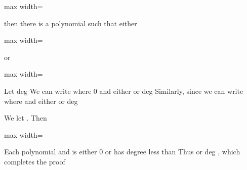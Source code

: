 \documentclass[11pt,oneside]{article}
\begin{document}
\begin{BookBody}
\begin{center}\begin{adjustbox}{max width=\linewidth}\end{adjustbox}\end{center}

\noindent then there is a polynomial  such that either

\begin{center}\begin{adjustbox}{max width=\linewidth}\end{adjustbox}\end{center}

\noindent or

\begin{center}\begin{adjustbox}{max width=\linewidth}\end{adjustbox}\end{center}

 Let  deg We can write  where  0 and either  or deg Similarly, since  we can write   where  and either  or deg

We let . Then

\begin{center}\begin{adjustbox}{max width=\linewidth}\end{adjustbox}\end{center}

\noindent Each polynomial  and  is either 0 or has degree less than  Thus  or deg , which completes the proof\BookEnd{\blacklozenge}


\end{BookBody}
\end{document}
